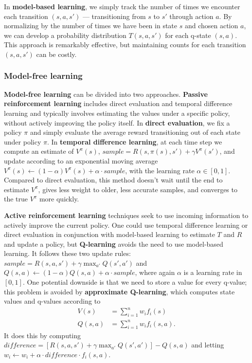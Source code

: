 \documentclass[12pt]{article}
\begin{document}
In \textbf{model-based learning}, we simply track the number of times we encounter each transition $(s, a, s')$ --- transitioning from $s$ to $s'$ through action $a$. By normalizing by the number of times we have been in state $s$ and chosen action $a$, we can develop a probability distribution $T(s, a, s')$ for each q-state $(s, a)$. This approach is remarkably effective, but maintaining counts for each transition $(s, a, s')$ can be costly.

\subsubsection{Model-free learning}

\textbf{Model-free learning} can be divided into two approaches. \textbf{Passive reinforcement learning} includes direct evaluation and temporal difference learning and typically involves estimating the values under a specific policy, without actively improving the policy itself. In \textbf{direct evaluation}, we fix a policy $\pi$ and simply evaluate the average reward transitioning out of each state under policy $\pi$. In \textbf{temporal difference learning}, at each time step we compute an estimate of $V^\pi(s)$, $sample = R(s, \pi(s), s') + \gamma V^\pi(s')$, and update according to an exponential moving average $V^\pi(s) \gets (1 - \alpha)V^\pi(s) + \alpha \cdot sample$, with the learning rate $\alpha \in [0, 1]$. Compared to direct evaluation, this method doesn't wait until the end to estimate $V^\pi$, gives less weight to older, less accurate samples, and converges to the true $V^\pi$ more quickly.

\textbf{Active reinforcement learning} techniques seek to use incoming information to actively improve the current policy. One could use temporal difference learning or direct evaluation in conjunction with model-based learning to estimate $T$ and $R$ and update a policy, but \textbf{Q-learning} avoids the need to use model-based learning. It follows these two update rules: $sample = R(s, a, s') + \gamma \max_{a'} Q(s', a')$ and $Q(s, a) \gets (1 - \alpha) Q(s, a) + \alpha \cdot sample$, where again $\alpha$ is a learning rate in $[0, 1]$. One potential downside is that we need to store a value for every q-value; this problem is avoided by \textbf{approximate Q-learning}, which computes state values and q-values according to
\begin{align*}
V(s) &= \sum_{i = 1}^n w_i f_i(s) \\
Q(s, a) &= \sum_{i = 1}^n w_i f_i(s, a).
\end{align*}
It does this by computing $difference = [R(s, a, s') + \gamma \max_{a'} Q(s', a')] - Q(s, a)$ and letting $w_i \gets w_i + \alpha \cdot difference \cdot f_i(s, a)$.
\end{document}
